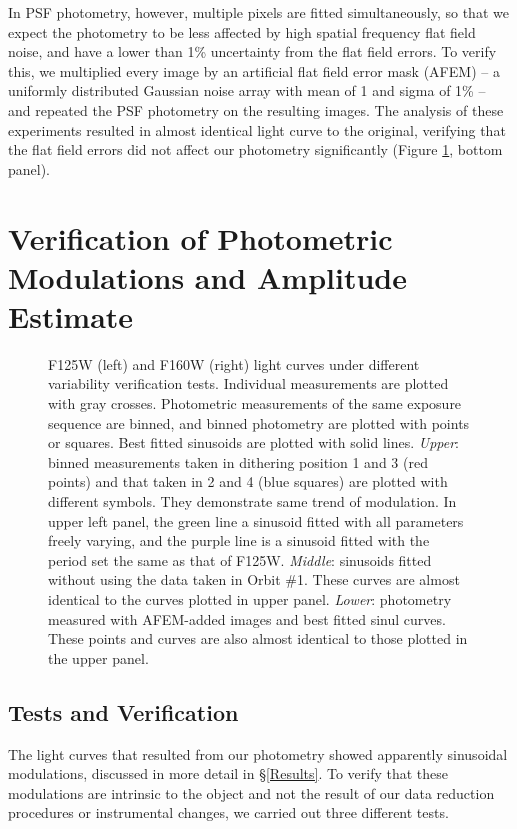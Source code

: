 \documentclass[apj]{emulateapj}
\begin{document}
In PSF photometry, however, multiple pixels are fitted simultaneously,
so that we expect the photometry to be less affected by high spatial frequency flat field
noise, and have a lower than 1\% uncertainty from the flat field
errors. To verify this, we multiplied every image by an artificial flat
field error mask (AFEM) -- a uniformly distributed Gaussian noise array with
mean of 1 and sigma of 1\% -- and repeated the PSF photometry on the
resulting images.  The analysis of these experiments resulted in almost
identical light curve to the original, verifying that the flat field
errors did not affect our photometry significantly (Figure
\ref{fig:2}, bottom panel).


\section{Verification of Photometric Modulations and Amplitude
  Estimate}

 \begin{figure}
  \centering
  \caption{F125W (left) and F160W (right) light curves under different
    variability verification tests. Individual measurements are
    plotted with gray crosses. Photometric measurements of the same exposure
    sequence are binned, and binned photometry are plotted with points
    or squares. Best fitted sinusoids are plotted with solid
    lines. {\em Upper}: binned measurements taken in dithering
    position 1 and 3 (red points) and that taken in 2 and 4 (blue
    squares) are plotted with different symbols. They demonstrate same
    trend of modulation. In upper left panel, the green line a sinusoid
    fitted with all parameters freely varying, and the purple line is
    a sinusoid fitted with the period set the same as that of
    F125W. {\em Middle}: sinusoids fitted without using the
    data taken in Orbit \#1. These curves are almost identical to the
    curves plotted in upper panel. {\em Lower}: photometry measured
    with AFEM-added images and best fitted sinul curves. These
    points and curves are also almost identical to those plotted
    in the upper panel.}
  \label{fig:2}
\end{figure}

\subsection{Tests and Verification}

The light curves that resulted from our photometry showed apparently
sinusoidal modulations, discussed in more detail in
\S\ref{Results}. To verify that these modulations are intrinsic to
the object and not the result of our data reduction procedures or 
instrumental changes, we carried out three different tests.
\end{document}
